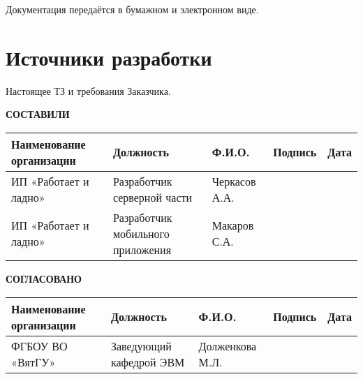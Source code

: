 \documentclass[oneside,a4paper,14pt]{extarticle}
\begin{document}
Документация передаётся в бумажном и электронном виде.

\section{Источники разработки}
Настоящее ТЗ и требования Заказчика.

\newpage
\begin{sidewaystable}
    \centering
    \textbf{СОСТАВИЛИ} \\[3mm]
    \begin{tabular}{|p{60mm}|p{50mm}|p{50mm}|p{25mm}|p{25mm}|}
        \hline
        Наименование организации & Должность                         & Ф.И.О.        & Подпись & Дата \\
        \hline
        ИП «Работает и ладно»    & Разработчик серверной части       & Черкасов А.А. &         &      \\
        \hline
        ИП «Работает и ладно»    & Разработчик мобильного приложения & Макаров С.А.  &         &      \\
        \hline
    \end{tabular}

    \vspace{20mm}

    \textbf{СОГЛАСОВАНО} \\[3mm]
    \begin{tabular}{|p{60mm}|p{50mm}|p{50mm}|p{25mm}|p{25mm}|}
        \hline
        Наименование организации & Должность               & Ф.И.О.          & Подпись & Дата \\
        \hline
        ФГБОУ ВО «ВятГУ»         & Заведующий кафедрой ЭВМ & Долженкова М.Л. &         &      \\
        \hline
    \end{tabular}
\end{sidewaystable}
\end{document}
